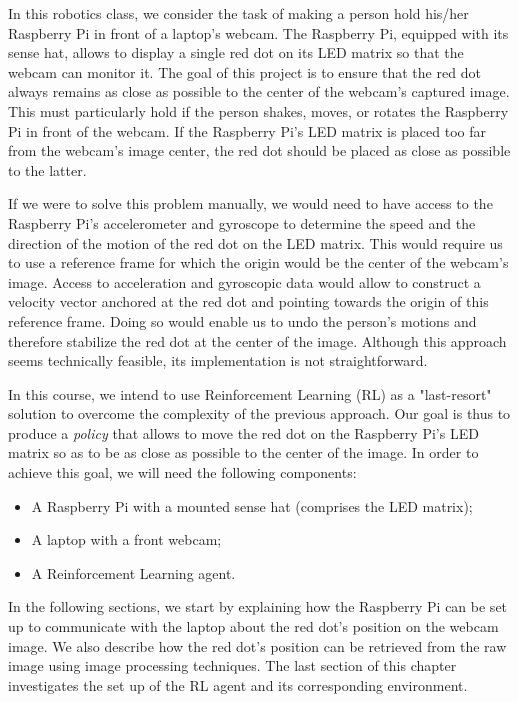 
In this robotics class, we consider the task of making a person hold his/her Raspberry Pi in front of a laptop's webcam.  The Raspberry Pi, equipped with its sense hat,  allows to display a single red dot on its LED matrix so that the webcam can monitor it. The goal of this project is to ensure that the red dot always remains as close as possible to the center of the webcam's captured image. This must particularly hold if the person shakes, moves, or rotates the Raspberry Pi in front of the webcam. If the Raspberry Pi's LED matrix is placed too far from the webcam's image center, the red dot should be placed as close as possible to the latter.

If we were to solve this problem manually, we would need to have access to the Raspberry Pi's accelerometer and gyroscope to determine the speed and the direction of the motion of the red dot on the LED matrix. This would require us to use a reference frame for which the origin would be the center of the webcam's image. Access to acceleration and gyroscopic data would allow to construct a velocity vector anchored at the red dot and pointing towards the origin of this reference frame. Doing so would enable us to undo the person's motions and therefore stabilize the red dot at the center of the image. Although this approach seems technically feasible, its implementation is not straightforward. 

In this course, we intend to use Reinforcement Learning (RL) as a "last-resort" solution to overcome the complexity of the previous approach. Our goal is thus to produce a \textit{policy} that allows to move the red dot on the Raspberry Pi's LED matrix so as to be as close as possible to the center of the image. In order to achieve this goal, we will need the following components:

\begin{itemize}
	\item A Raspberry Pi with a mounted sense hat (comprises the LED matrix);
	\item A laptop with a front webcam;
	\item A Reinforcement Learning agent.
\end{itemize}

In the following sections, we start by explaining how the Raspberry Pi can be set up to communicate with the laptop about the red dot's position on the webcam image.  We also describe how the red dot's position can be retrieved from the raw image using image processing techniques. The last section of this chapter investigates the set up of the RL agent and its corresponding environment.

